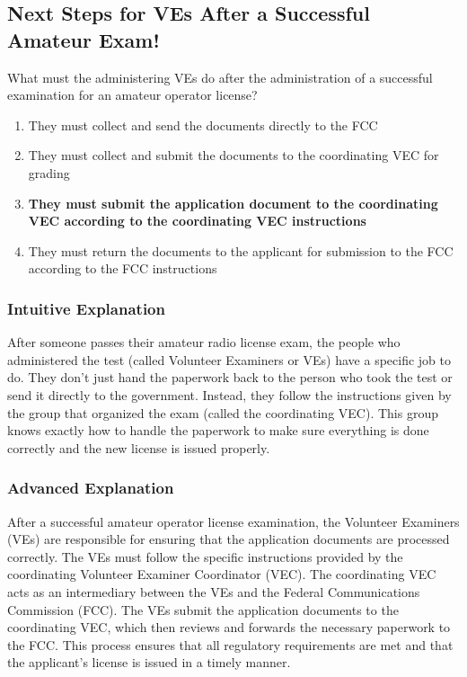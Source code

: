 \subsection{Next Steps for VEs After a Successful Amateur Exam!}

\begin{tcolorbox}[colback=gray!10!white,colframe=black!75!black,title=E1E10] What must the administering VEs do after the administration of a successful examination for an amateur operator license?
    \begin{enumerate}[label=\Alph*.]
        \item They must collect and send the documents directly to the FCC
        \item They must collect and submit the documents to the coordinating VEC for grading
        \item \textbf{They must submit the application document to the coordinating VEC according to the coordinating VEC instructions}
        \item They must return the documents to the applicant for submission to the FCC according to the FCC instructions
    \end{enumerate}
\end{tcolorbox}

\subsubsection{Intuitive Explanation}
After someone passes their amateur radio license exam, the people who administered the test (called Volunteer Examiners or VEs) have a specific job to do. They don’t just hand the paperwork back to the person who took the test or send it directly to the government. Instead, they follow the instructions given by the group that organized the exam (called the coordinating VEC). This group knows exactly how to handle the paperwork to make sure everything is done correctly and the new license is issued properly.

\subsubsection{Advanced Explanation}
After a successful amateur operator license examination, the Volunteer Examiners (VEs) are responsible for ensuring that the application documents are processed correctly. The VEs must follow the specific instructions provided by the coordinating Volunteer Examiner Coordinator (VEC). The coordinating VEC acts as an intermediary between the VEs and the Federal Communications Commission (FCC). The VEs submit the application documents to the coordinating VEC, which then reviews and forwards the necessary paperwork to the FCC. This process ensures that all regulatory requirements are met and that the applicant’s license is issued in a timely manner. 

